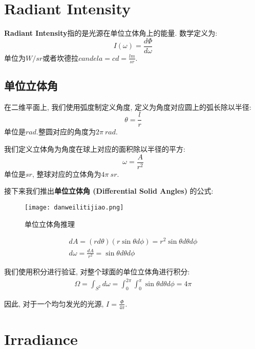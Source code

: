 \documentclass[openany]{progbookcn}
\begin{document}
\section{Radiant Intensity}
\textbf{Radiant Intensity}指的是光源在单位立体角上的能量. 数学定义为: 
\begin{equation}
	I(\omega)=\frac{d\Phi}{d\omega}
\end{equation} 单位为$W/sr$或者坎德拉$candela=cd=\frac{lm}{sr}$.

\subsection{单位立体角}
在二维平面上, 我们使用弧度制定义角度, 定义为角度对应圆上的弧长除以半径: 
\begin{equation}
	\theta = \frac{l}{r}
\end{equation} 单位是$rad$.整圆对应的角度为$2\pi\ rad$.

我们定义立体角为角度在球上对应的面积除以半径的平方: 
\begin{equation}
	\omega=\frac{A}{r^2}
\end{equation} 单位是$sr$, 整球对应的立体角为$4\pi\ sr$.

接下来我们推出\textbf{单位立体角 (Differential Solid Angles) }的公式: 
\begin{figure}[H]
	\centering
	\texttt{[image: danweilitijiao.png]}
	\caption{单位立体角推理}
	\label{fig:dwltj}
\end{figure}

\begin{equation}
\begin{split}
	dA=(rd\theta)(r\sin \theta d \phi)=r^2\sin\theta d\theta d\phi \\
	d\omega=\frac{dA}{r^2}=\sin\theta d\theta d\phi
\end{split}
\end{equation}

我们使用积分进行验证, 对整个球面的单位立体角进行积分: 
\begin{equation}
	\begin{split}
		\Omega=\int_{S^2}d\omega=\int_{0}^{2\pi}\int_{0}^{\pi}\sin\theta d\theta d\phi = 4\pi
	\end{split}
\end{equation}

因此, 对于一个均匀发光的光源, $I=\frac{\Phi}{4\pi}$. 

\section{Irradiance}
\end{document}
